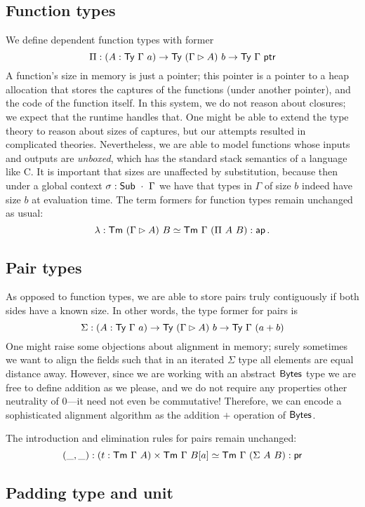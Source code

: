 \subsection{Function types}\label{function-types}

We define dependent function types with former \[
\Pi : (A : \textsf{Ty}\ \Gamma\ a) \to \textsf{Ty}\ (\Gamma \rhd A)\ b \to \textsf{Ty}\ \Gamma\ \textsf{ptr}
\] A function's size in memory is just a pointer; this pointer is a
pointer to a heap allocation that stores the captures of the functions
(under another pointer), and the code of the function itself. In this
system, we do not reason about closures; we expect that the runtime
handles that. One might be able to extend the type theory to reason
about sizes of captures, but our attempts resulted in complicated
theories. Nevertheless, we are able to model functions whose inputs and
outputs are \emph{unboxed}, which has the standard stack semantics of a
language like C. It is important that sizes are unaffected by
substitution, because then under a global context
\(\sigma : \textsf{Sub}\ \cdot\ \Gamma\) we have that types in \(\Gamma\) of
size \(b\) indeed have size \(b\) at evaluation time. The term formers
for function types remain unchanged as usual: \[
\lambda : \textsf{Tm}\ (\Gamma \rhd A)\ B \simeq \textsf{Tm}\ \Gamma\ (\Pi\ A\ B) : \textsf{ap} \,.
\]

\subsection{Pair types}\label{pair-types}

As opposed to function types, we are able to store pairs truly
contiguously if both sides have a known size. In other words, the type
former for pairs is \[
\Sigma : (A : \Ty\ \Gamma\ a) \to \Ty\ (\Gamma \rhd A)\ b \to \Ty\ \Gamma\ (a + b)
\] One might raise some objections about alignment in memory; surely
sometimes we want to align the fields such that in an iterated
\(\Sigma\) type all elements are equal distance away. However, since we
are working with an abstract \(\textsf{Bytes}\) type we are free to define
addition as we please, and we do not require any properties other
neutrality of 0---it need not even be commutative! Therefore, we can
encode a sophisticated alignment algorithm as the addition \(+\)
operation of \(\textsf{Bytes}\).

The introduction and elimination rules for pairs remain unchanged: \[
(\_,\_) : (t : \Tm\ \Gamma\ A) \times \Tm\ \Gamma\ B[a]
\simeq \Tm\ \Gamma\ (\Sigma\ A\ B) : \syn{pr}
\]

\subsection{Padding type and unit}\label{padding-type-and-unit}

